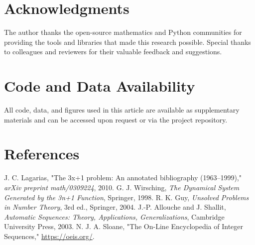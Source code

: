 \documentclass[12pt]{article}
\begin{document}
\section*{Acknowledgments}
The author thanks the open-source mathematics and Python communities for providing the tools and libraries that made this research possible. Special thanks to colleagues and reviewers for their valuable feedback and suggestions.

\section*{Code and Data Availability}
All code, data, and figures used in this article are available as supplementary materials and can be accessed upon request or via the project repository.

\section*{References}
\begin{thebibliography}{9}
 J. C. Lagarias, "The 3x+1 problem: An annotated bibliography (1963–1999)," \emph{arXiv preprint math/0309224}, 2010.
 G. J. Wirsching, \emph{The Dynamical System Generated by the 3n+1 Function}, Springer, 1998.
 R. K. Guy, \emph{Unsolved Problems in Number Theory}, 3rd ed., Springer, 2004.
 J.-P. Allouche and J. Shallit, \emph{Automatic Sequences: Theory, Applications, Generalizations}, Cambridge University Press, 2003.
 N. J. A. Sloane, "The On-Line Encyclopedia of Integer Sequences," \url{https://oeis.org/}.
\end{thebibliography}
\end{document}
